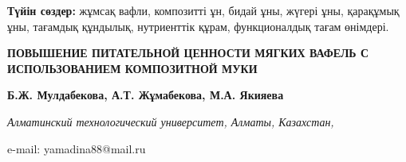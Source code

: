 {\bfseries Түйін сөздер:} жұмсақ вафли, композитті ұн, бидай ұны, жүгері
ұны, қарақұмық ұны, тағамдық құндылық, нутриенттік құрам, функционалдық
тағам өнімдері.

\begin{articleheader}
{\bfseries ПОВЫШЕНИЕ ПИТАТЕЛЬНОЙ ЦЕННОСТИ МЯГКИХ ВАФЕЛЬ С ИСПОЛЬЗОВАНИЕМ
КОМПОЗИТНОЙ МУКИ}

{\bfseries
Б.Ж. Мулдабекова,
А.Т. Жұмабекова,
М.А. Якияева\textsuperscript{\envelope }
}
\end{articleheader}

\begin{affiliation}
\emph{Алматинский технологический университет, Алматы, Казахстан,}

e-mail: yamadina88@mail.ru
\end{affiliation}

